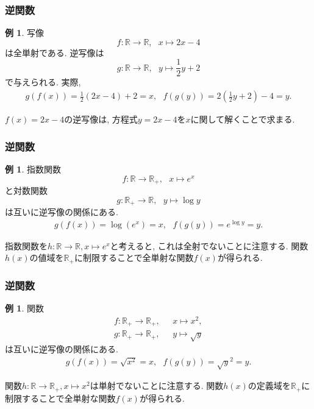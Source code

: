 \documentclass[dvipdfmx,cjk,10.2pt]{beamer}
\newcommand{\R}{\mathbb{R}}
\theoremstyle{definition}
\newtheorem{Ex}[Thm]{例}
\begin{document}
\begin{frame}
\frametitle{逆関数}



\begin{Ex}
写像
$$
f:\R \longrightarrow \R, \ \ \ x \mapsto 2x-4
$$
は全単射である. 
逆写像は
$$
g:\R \longrightarrow \R, \ \ \ y \mapsto \frac{1}{2}y+2
$$
で与えられる. 
実際, 
\begin{align*}
g(f(x))=\frac{1}{2}(2x-4)+2=x, \ \ \ 
f(g(y))=2(\frac{1}{2}y+2)-4=y. 
\end{align*}
\end{Ex}
$f(x)=2x-4$の逆写像は, 方程式$y=2x-4$を$x$に関して解くことで求まる. 


\end{frame}





\begin{frame}
\frametitle{逆関数}



\begin{Ex}
指数関数
$$
f: \R \longrightarrow \R_+, \ \ \ x \mapsto e^x
$$
と対数関数
$$
g: \R_+ \longrightarrow \R, \ \ \ y \mapsto \log y
$$
は互いに逆写像の関係にある. 
\begin{align*}
g(f(x))=\log(e^x)=x, \ \ \ f(g(y))=e^{\log y}=y.
\end{align*}
\end{Ex}
指数関数を$h:\R \rightarrow \R, x \mapsto e^x$と考えると, これは全射でないことに注意する. 
関数$h(x)$の値域を$\R_+$に制限することで全単射な関数$f(x)$が得られる. 

\end{frame}




\begin{frame}
\frametitle{逆関数}



\begin{Ex}
関数
\begin{align*}
f: \R_+ \longrightarrow \R_+, & \ \ \ x \mapsto x^2, \\
g: \R_+ \longrightarrow \R_+, & \ \ \ y \mapsto \sqrt{y}
\end{align*}
は互いに逆写像の関係にある. 
\begin{align*}
g(f(x))=\sqrt{x^2}=x, \ \ \ f(g(y))=\sqrt{y}^2=y.
\end{align*}
\end{Ex}
関数$h:\R \rightarrow \R_+, x \mapsto x^2$は単射でないことに注意する. 
関数$h(x)$の定義域を$\R_+$に制限することで全単射な関数$f(x)$が得られる. 
\end{frame}
\end{document}

